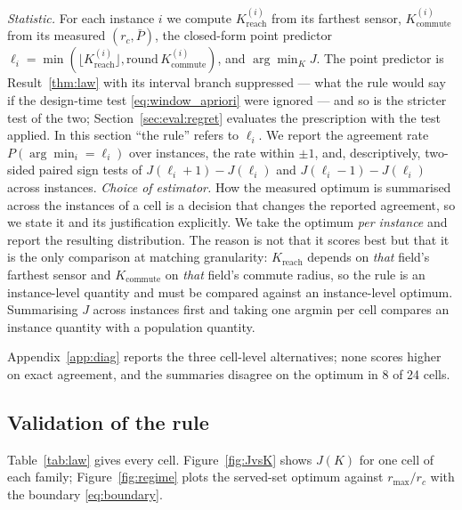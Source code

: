 \documentclass[journal,outdir=./]{IEEEtran}
\newcommand{\Kr}{K_{\mathrm{reach}}}
\newcommand{\Kc}{K_{\mathrm{commute}}}
\newcommand{\rmax}{r_{\max}}
\newcommand{\rc}{r_{c}}
\newcommand{\Pbar}{\bar{P}}
\begin{document}
\textit{Statistic.} For each instance $i$ we compute $\Kr^{(i)}$ from its farthest sensor, $\Kc^{(i)}$ from its measured $(\rc,\Pbar)$, the closed-form point predictor $\ell_i=\min(\lfloor\Kr^{(i)}\rfloor,\mathrm{round}\,\Kc^{(i)})$, and $\arg\min_K J$. The point predictor is Result~\ref{thm:law} with its interval branch suppressed --- what the rule would say if the design-time test \eqref{eq:window_apriori} were ignored --- and so is the stricter test of the two; Section~\ref{sec:eval:regret} evaluates the prescription with the test applied. In this section ``the rule'' refers to $\ell_i$. We report the agreement rate $P(\arg\min_i=\ell_i)$ over instances, the rate within $\pm1$, and, descriptively, two-sided paired sign tests of $J(\ell_i\!+\!1)-J(\ell_i)$ and $J(\ell_i\!-\!1)-J(\ell_i)$ across instances. \textit{Choice of estimator.} How the measured optimum is summarised across the instances of a cell is a decision that changes the reported agreement, so we state it and its justification explicitly. We take the optimum \emph{per instance} and report the resulting distribution. The reason is not that it scores best but that it is the only comparison at matching granularity: $\Kr$ depends on \emph{that} field's farthest sensor and $\Kc$ on \emph{that} field's commute radius, so the rule is an instance-level quantity and must be compared against an instance-level optimum. Summarising $J$ across instances first and taking one argmin per cell compares an instance quantity with a population quantity.

Appendix~\ref{app:diag} reports the three cell-level alternatives; none scores higher on exact agreement, and the summaries disagree on the optimum in 8 of 24 cells.

\subsection{Validation of the rule}\label{sec:eval:law}
Table~\ref{tab:law} gives every cell. Figure~\ref{fig:JvsK} shows $J(K)$ for one cell of each family; Figure~\ref{fig:regime} plots the served-set optimum against $\rmax/\rc$ with the boundary \eqref{eq:boundary}.
\end{document}
